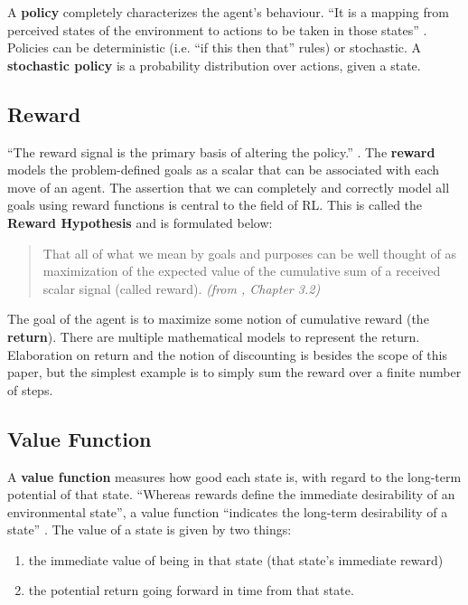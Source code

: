 A \textbf{policy} completely characterizes the agent’s behaviour.
``It is a mapping from perceived states of the environment to actions to be taken in those states'' \cite{rlai}.
Policies can be deterministic (i.e. ``if this then that'' rules) or stochastic.
A \textbf{stochastic policy}\cite{silver-lectures} is a probability distribution over actions, given a state.

\subsection{Reward}
``The reward signal is the primary basis of altering the policy.'' \cite{rlai}.
The \textbf{reward} models the problem-defined goals as a scalar that can be associated with each move of an agent.
The assertion that we can completely and correctly model all goals using reward functions is central to the field of RL.
This is called the \textbf{Reward Hypothesis} and is formulated below:
\begin{quotation}
    That all of what we mean by goals and purposes can be well thought of as maximization of the expected value of the cumulative sum of a received scalar signal (called reward). \textit{(from \cite{rlai}, Chapter 3.2)}
\end{quotation}

The goal of the agent is to maximize some notion of cumulative reward (the \textbf{return}).
There are multiple mathematical models to represent the return.
Elaboration on return and the notion of discounting is besides the scope of this paper, but the simplest example is to simply sum the reward over a finite number of steps.

\subsection{Value Function}

A \textbf{value function} measures how good each state is, with regard to the long-term potential of that state.
``Whereas rewards define the immediate desirability of an environmental state'', a value function ``indicates the long-term desirability of a state'' \cite{rlai}.
The value of a state is given by two things:
\begin{enumerate}
    \item the immediate value of being in that state (that state’s immediate reward)
    \item the potential return going forward in time from that state.
\end{enumerate}

